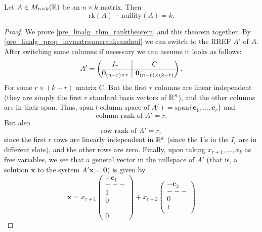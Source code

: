 \documentclass[10pt, a4paper]{article}
\newcommand{\mbf}[1]{\mathbf{#1}}
\begin{document}
\begin{theorem}
    Let $A \in M_{n \times k}(\mathbb{R})$ be an $n \times k$ matrix.
    Then
    \[
    \mathrm{rk}(A) + \mathrm{nullity}(A) = k.
    \]
    \begin{proof}
        We prove \autoref{pre_linalg_thm_ranktheorem} and this theorem together.
        By \autoref{pre_linalg_prop_invmatrsameranksandnul} we can switch to the RREF $A'$ of $A$.
        After switching some columns if necessary we can assume it looks as follows:
        \[
        A' = \left(\hspace{-5pt}\begin{array}{c|c}
             I_r & C  \\
             \hline
             \mbf{0}_{(n - r)\times r} & \mbf{0}_{(n - r) \times (k - r)}
        \end{array}\hspace{-5pt}\right).
        \]
        For some $r \times (k - r)$ matrix $C$.
        But the first $r$ columns are linear independent
        (they are simply the first $r$ standard basis vectors of $\mathbb{R} ^ n$),
        and the other columns are in their span.
        Thus,
        $\mathrm{span}(\text{column space of } A') = \mathrm{span}\{\mbf{e}_1, \dotsc, \mbf{e}_r\}$ and
        \[
        \text{column rank of } A' = r.
        \]
        But also
        \[
        \text{row rank of } A' = r,
        \]
        since the first $r$ rows are linearly independent in $\mathbb{R} ^ k$
        (since the $1$'s in the $I_r$ are in different slots),
        and the other rows are zero.
        Finally,
        upon taking $x_{r + 1}, \dotsc, x_k$ as free variables,
        we see that a general vector in the nullspace of $A'$
        (that is,
        a solution $\mbf{x}$ to the system $A'\mbf{x} = \mbf{0}$)
        is given by
        \[
        \mbf{x} = x_{r + 1}\begin{pmatrix}
            -\mbf{c}_1 \\
            - - - \\
            1 \\
            0 \\
            \vdots \\
            0
        \end{pmatrix}
        + x_{r + 2}\begin{pmatrix}
            -\mbf{c}_2 \\
            - - - \\
            0 \\
            1 \\

\end{pmatrix}\]
\end{proof}
\end{theorem}
\end{document}
